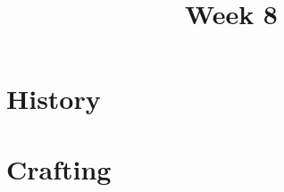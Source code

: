 \documentclass[11pt]{article}
\title{Week 8}
\date{}
\begin{document}
    \maketitle

    \section*{History}
        \begin{itemize}
        \end{itemize}

    \section*{Crafting}
        \begin{itemize}
        \end{itemize}
\end{document}
